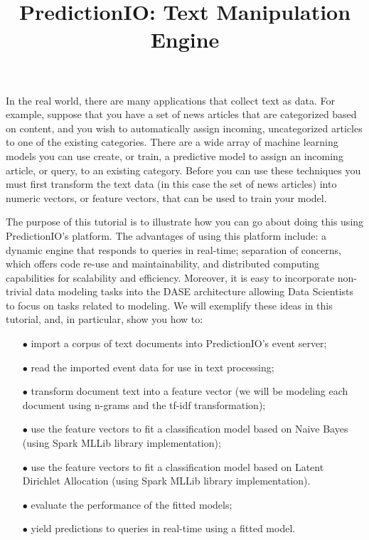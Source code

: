 \documentclass[a4paper,12pt]{article}
\renewcommand{\bf}[1]{\textbf{#1}}
\newcommand{\3}{\left}
\newcommand{\4}{\right}
\renewcommand{\-}[1]{{}^{-#1}}
\begin{document}
\title{\vspace{-1.5 cm}\bf{PredictionIO: Text Manipulation Engine}}
\author{\vspace{-2cm}}
\date{}
\maketitle


In the real world, there are many applications that collect text as data. For example, suppose that you have a set of news articles that are categorized based on content, and you wish to automatically assign incoming, uncategorized articles to one of the existing categories. There are a wide array of machine learning models you can use create, or train, a predictive model to assign an incoming article, or query, to an existing category. Before you can use these techniques you must first transform the text data (in this case the set of news articles) into numeric vectors, or feature vectors, that can be used to train your model.

The purpose of this tutorial is to illustrate how you can go about doing this using PredictionIO's platform. The advantages of using this platform include: a dynamic engine that responds to queries in real-time; separation of concerns,
 which offers code re-use and maintainability, and distributed computing capabilities for scalability and efficiency. Moreover, it is easy to incorporate non-trivial data modeling tasks into the DASE architecture allowing Data Scientists to focus on tasks related to modeling. We will exemplify these ideas in this tutorial, and, in particular, show you how to:

\begin{itemize}
\item[$\bullet$]{import a corpus of text documents into PredictionIO's event server;}

\item[$\bullet$]{read the imported event data for use in text processing;}

\item[$\bullet$]{transform document text into a feature vector (we will be modeling each document using n-grams and the tf-idf transformation);}

\item[$\bullet$]{use the feature vectors to fit a classification model based on Naive Bayes (using Spark MLLib library implementation);}

\item[$\bullet$]{use the feature vectors to fit a classification model based on Latent Dirichlet Allocation (using Spark MLLib library implementation).}

\item[$\bullet$]{evaluate the performance of the fitted models;}

\item[$\bullet$]{yield predictions to queries in real-time using a fitted model.}
\end{itemize}
\end{document}
